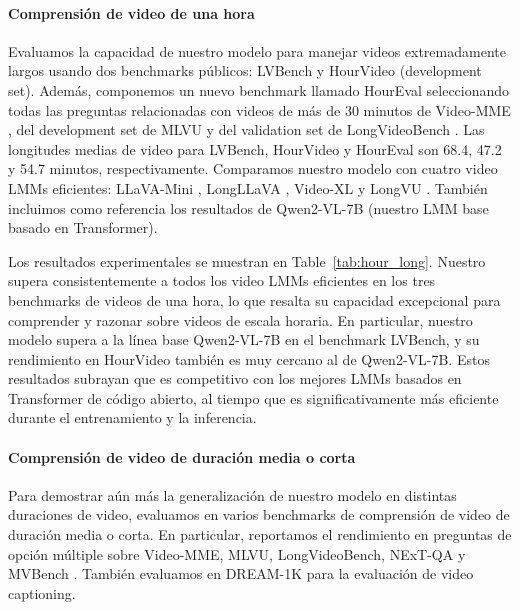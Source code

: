 \paragraph{Comprensión de video de una hora} Evaluamos la capacidad de nuestro modelo para manejar videos extremadamente largos usando dos benchmarks públicos: LVBench \cite{wang2024lvbench} y HourVideo \cite{chandrasegaran2025hourvideo} (development set). Además, componemos un nuevo benchmark llamado HourEval seleccionando todas las preguntas relacionadas con videos de más de 30 minutos de Video-MME \cite{fu2024video}, del development set de MLVU \cite{zhou2024mlvu} y del validation set de LongVideoBench \cite{wu2025longvideobench}. Las longitudes medias de video para LVBench, HourVideo y HourEval son 68.4, 47.2 y 54.7 minutos, respectivamente. Comparamos nuestro modelo con cuatro video LMMs eficientes: LLaVA-Mini \cite{zhang2025llava}, LongLLaVA \cite{wang2024longllava}, Video-XL \cite{shu2024video} y LongVU \cite{shen2024longvu}. También incluimos como referencia los resultados de Qwen2-VL-7B (nuestro LMM base basado en Transformer).

Los resultados experimentales se muestran en Table~\ref{tab:hour_long}. Nuestro \model supera consistentemente a todos los video LMMs eficientes en los tres benchmarks de videos de una hora, lo que resalta su capacidad excepcional para comprender y razonar sobre videos de escala horaria. En particular, nuestro modelo supera a la línea base Qwen2-VL-7B en el benchmark LVBench, y su rendimiento en HourVideo también es muy cercano al de Qwen2-VL-7B. Estos resultados subrayan que \model es competitivo con los mejores LMMs basados en Transformer de código abierto, al tiempo que es significativamente más eficiente durante el entrenamiento y la inferencia.

\vspace{-1em}
\paragraph{Comprensión de video de duración media o corta}
Para demostrar aún más la generalización de nuestro modelo en distintas duraciones de video, evaluamos \model en varios benchmarks de comprensión de video de duración media o corta. En particular, reportamos el rendimiento en preguntas de opción múltiple sobre Video-MME, MLVU, LongVideoBench, NExT-QA \cite{xiao2021next} y MVBench \cite{li2024mvbench}. También evaluamos \model en DREAM-1K \cite{wang2024tarsier} para la evaluación de video captioning.

